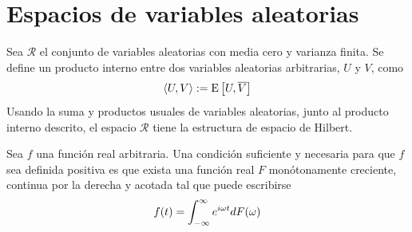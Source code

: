
\section{Espacios de variables aleatorias}

\begin{proposicion}
Sea $\mathcal{R}$ el conjunto de variables aleatorias con media cero y varianza finita. Se define un producto interno entre dos variables aleatorias arbitrarias, $U$ y $V$, como
\begin{equation}
\langle U , V \rangle := \mathrm{E}\left[ U, \overline{V} \right]
\end{equation}
Usando la suma y productos usuales de variables aleatorias, junto al producto interno descrito, el espacio $\mathcal{R}$ tiene la estructura de espacio de Hilbert.
\end{proposicion}



\begin{teorema}[Bochner]
Sea $f$ una función real arbitraria. Una condición suficiente y necesaria para que $f$ sea definida positiva es que exista una función real $F$ monótonamente creciente, continua por la derecha y acotada tal que puede escribirse
\begin{equation}
f(t) = \int_{-\infty}^{\infty} e^{i \omega t} dF(\omega)
\end{equation}
\end{teorema}


